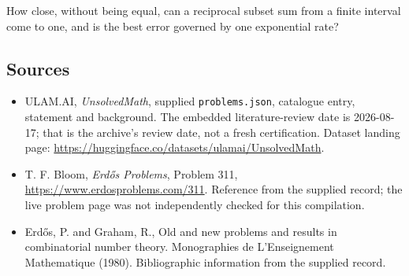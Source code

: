 \documentclass[11pt,a4paper]{article}
\begin{document}
How close, without being equal, can a reciprocal subset sum from a finite interval come to one, and is the best error governed by one exponential rate?

\subsection{Sources}

{\small

\begin{itemize}

\item[\hypertarget{source:statement:1}{S1}] ULAM.AI, \emph{UnsolvedMath}, supplied \texttt{problems.json}, catalogue entry, statement and background. The embedded literature-review date is 2026-08-17; that is the archive’s review date, not a fresh certification. Dataset landing page: \url{https://huggingface.co/datasets/ulamai/UnsolvedMath}.

\item[\hypertarget{source:statement:2}{S2}] T. F. Bloom, \emph{Erdős Problems}, Problem 311, \url{https://www.erdosproblems.com/311}. Reference from the supplied record; the live problem page was not independently checked for this compilation.

\item[\hypertarget{source:statement:3}{S3}] Erd\H{o}s, P. and Graham, R., Old and new problems and results in combinatorial number theory. Monographies de L'Enseignement Mathematique (1980). Bibliographic information from the supplied record.

\end{itemize}

}

\label{end:statement}
\end{document}
